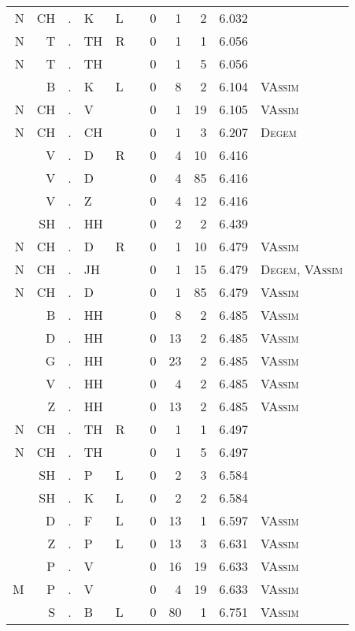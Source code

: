 \begin{longtable}{r@{ } r@{ } c@{ } l@{ } l@{ } l@{ } r r r r l }
N & CH & . & K & L &   & 0 & 1 & 2 & 6.032 &  \\
N & T & . & TH & R &   & 0 & 1 & 1 & 6.056 &  \\
N & T & . & TH &   &   & 0 & 1 & 5 & 6.056 &  \\
  & B & . & K & L &   & 0 & 8 & 2 & 6.104 & \textsc{VAssim} \\
N & CH & . & V &   &   & 0 & 1 & 19 & 6.105 & \textsc{VAssim} \\
N & CH & . & CH &   &   & 0 & 1 & 3 & 6.207 & \textsc{Degem} \\
  & V & . & D & R &   & 0 & 4 & 10 & 6.416 &  \\
  & V & . & D &   &   & 0 & 4 & 85 & 6.416 &  \\
  & V & . & Z &   &   & 0 & 4 & 12 & 6.416 &  \\
  & SH & . & HH &   &   & 0 & 2 & 2 & 6.439 &  \\
N & CH & . & D & R &   & 0 & 1 & 10 & 6.479 & \textsc{VAssim} \\
N & CH & . & JH &   &   & 0 & 1 & 15 & 6.479 & \textsc{Degem}, \textsc{VAssim} \\
N & CH & . & D &   &   & 0 & 1 & 85 & 6.479 & \textsc{VAssim} \\
  & B & . & HH &   &   & 0 & 8 & 2 & 6.485 & \textsc{VAssim} \\
  & D & . & HH &   &   & 0 & 13 & 2 & 6.485 & \textsc{VAssim} \\
  & G & . & HH &   &   & 0 & 23 & 2 & 6.485 & \textsc{VAssim} \\
  & V & . & HH &   &   & 0 & 4 & 2 & 6.485 & \textsc{VAssim} \\
  & Z & . & HH &   &   & 0 & 13 & 2 & 6.485 & \textsc{VAssim} \\
N & CH & . & TH & R &   & 0 & 1 & 1 & 6.497 &  \\
N & CH & . & TH &   &   & 0 & 1 & 5 & 6.497 &  \\
  & SH & . & P & L &   & 0 & 2 & 3 & 6.584 &  \\
  & SH & . & K & L &   & 0 & 2 & 2 & 6.584 &  \\
  & D & . & F & L &   & 0 & 13 & 1 & 6.597 & \textsc{VAssim} \\
  & Z & . & P & L &   & 0 & 13 & 3 & 6.631 & \textsc{VAssim} \\
  & P & . & V &   &   & 0 & 16 & 19 & 6.633 & \textsc{VAssim} \\
M & P & . & V &   &   & 0 & 4 & 19 & 6.633 & \textsc{VAssim} \\
  & S & . & B & L &   & 0 & 80 & 1 & 6.751 & \textsc{VAssim} \\

\end{longtable}
